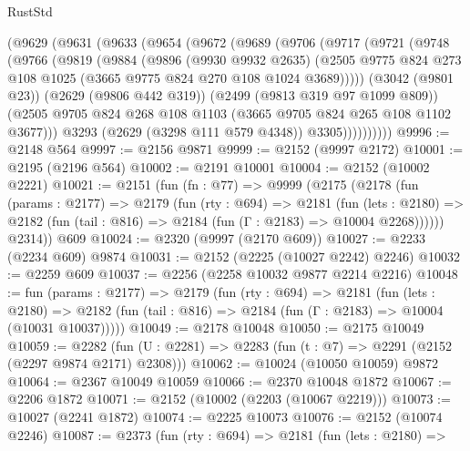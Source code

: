 \begin{lexlean}{RustStd}
\begin{coremodule}
    (@9629
      (@9631
        (@9633
          (@9654
            (@9672
              (@9689
                (@9706
                  (@9717
                    (@9721
                      (@9748
                        (@9766
                          (@9819
                            (@9884
                              (@9896
                                (@9930 @9932 @2635)
                                (@2505
                                  @9775
                                  @824
                                  @273
                                  @108
                                  @1025
                                  (@3665 @9775 @824 @270 @108 @1024 @3689)))))
                          (@3042 (@9801 @23))
                          (@2629 (@9806 @442 @319))
                          (@2499 (@9813 @319 @97 @1099 @809))
                          (@2505
                            @9705
                            @824
                            @268
                            @108
                            @1103
                            (@3665 @9705 @824 @265 @108 @1102 @3677)))
                        @3293
                        (@2629 (@3298 @111 @579 @4348))
                        @3305))))))))))
@9996 := @2148 @564
@9997 := @2156 @9871
@9999 := @2152 (@9997 @2172)
@10001 := @2195 (@2196 @564)
@10002 := @2191 @10001
@10004 := @2152 (@10002 @2221)
@10021 := @2151
    (fun (fn : @77) =>
    @9999
      (@2175
        (@2178
          (fun (params : @2177) =>
          @2179
            (fun (rty : @694) =>
            @2181
              (fun (lets : @2180) =>
              @2182 (fun (tail : @816) => @2184 (fun (Γ : @2183) => @10004 @2268))))))
        @2314))
    @609
@10024 := @2320 (@9997 (@2170 @609))
@10027 := @2233 (@2234 @609) @9874
@10031 := @2152 (@2225 (@10027 @2242) @2246)
@10032 := @2259 @609
@10037 := @2256 (@2258 @10032 @9877 @2214 @2216)
@10048 := fun (params : @2177) =>
  @2179
    (fun (rty : @694) =>
    @2181
      (fun (lets : @2180) =>
      @2182 (fun (tail : @816) => @2184 (fun (Γ : @2183) => @10004 (@10031 @10037)))))
@10049 := @2178 @10048
@10050 := @2175 @10049
@10059 := @2282 (fun (U : @2281) => @2283 (fun (t : @7) => @2291 (@2152 (@2297 @9874 @2171) @2308)))
@10062 := @10024 (@10050 @10059) @9872
@10064 := @2367 @10049 @10059
@10066 := @2370 @10048 @1872
@10067 := @2206 @1872
@10071 := @2152 (@10002 (@2203 (@10067 @2219)))
@10073 := @10027 (@2241 @1872)
@10074 := @2225 @10073
@10076 := @2152 (@10074 @2246)
@10087 := @2373
    (fun (rty : @694) =>
    @2181
      (fun (lets : @2180) =>

\end{coremodule}
\end{lexlean}
